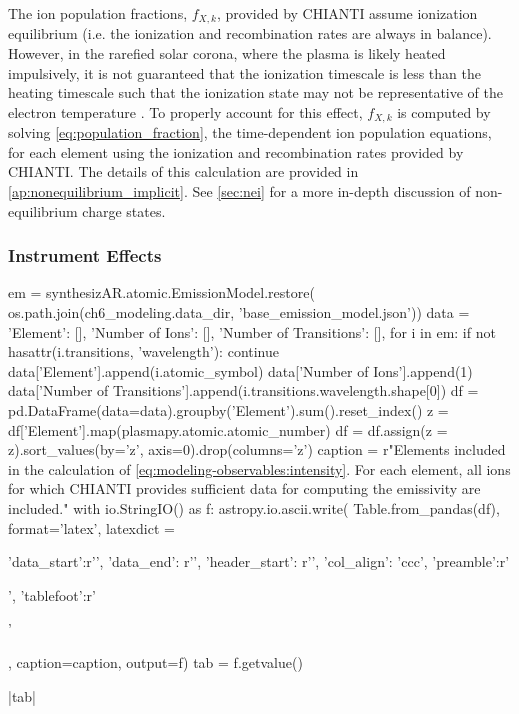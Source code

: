 The ion population fractions, $f_{X,k}$, provided by CHIANTI assume ionization equilibrium (i.e. the ionization and recombination rates are always in balance). However, in the rarefied solar corona, where the plasma is likely heated impulsively, it is not guaranteed that the ionization timescale is less than the heating timescale such that the ionization state may not be representative of the electron temperature \citep{bradshaw_explosive_2006,reale_nonequilibrium_2008,bradshaw_numerical_2009}. To properly account for this effect, $f_{X,k}$ is computed by solving \autoref{eq:population_fraction}, the time-dependent ion population equations, for each element using the ionization and recombination rates provided by CHIANTI. The details of this calculation are provided in \autoref{ap:nonequilibrium_implicit}. See \autoref{sec:nei} for a more in-depth discussion of non-equilibrium charge states.

\subsubsection{Instrument Effects}\label{sec:modeling-observables:instrument}

\begin{pycode}
em = synthesizAR.atomic.EmissionModel.restore(
    os.path.join(ch6_modeling.data_dir, 'base_emission_model.json'))
data = {'Element': [], 'Number of Ions': [], 'Number of Transitions': [],}
for i in em:
    if not hasattr(i.transitions, 'wavelength'):
        continue
    data['Element'].append(i.atomic_symbol)
    data['Number of Ions'].append(1)
    data['Number of Transitions'].append(i.transitions.wavelength.shape[0])
df = pd.DataFrame(data=data).groupby('Element').sum().reset_index()
z = df['Element'].map(plasmapy.atomic.atomic_number)
df = df.assign(z = z).sort_values(by='z', axis=0).drop(columns='z')
caption = r"Elements included in the calculation of \autoref{eq:modeling-observables:intensity}. For each element, all ions for which CHIANTI provides sufficient data for computing the emissivity are included.\label{tab:modeling-observables:elements}"
with io.StringIO() as f:
    astropy.io.ascii.write(
        Table.from_pandas(df),
        format='latex',
        latexdict = {'data_start':r'\midrule', 'data_end': r'\bottomrule',
                     'header_start': r'\toprule', 'col_align': 'ccc',
                     'preamble':r'\begin{center}', 'tablefoot':r'\end{center}'},
        caption=caption,
        output=f)
    tab = f.getvalue()
\end{pycode}
|tab|

